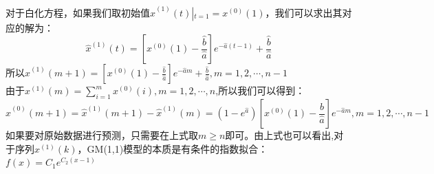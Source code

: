 \documentclass[openany]{progbookcn}
\begin{document}
\indent 对于白化方程，如果我们取初始值${\hat x^{(1)}}(t)\left| {_{t = 1} = {x^{(0)}}(1)} \right.$，我们可以求出其对应的解为：
\begin{equation}
{\hat x^{(1)}}(t) = \left[ {{x^{(0)}}(1) - \frac{{\hat b}}{{\hat a}}} \right]{e^{ - \hat a(t - 1)}} + \frac{{\hat b}}{{\hat a}}
\end{equation}
\indent 所以${\hat x^{(1)}}(m + 1) = \left[ {{x^{(0)}}(1) - \frac{{\hat b}}{{\hat a}}} \right]{e^{ - \hat am}} + \frac{{\hat b}}{{\hat a}},m = 1,2, \cdots ,n - 1$\\
\indent 由于${x^{(1)}}(m) = \sum\limits_{i = 1}^m {{x^{(0)}}(i),m = 1,2, \cdots ,n} $,所以我们可以得到：
\begin{equation}
{\hat x^{(0)}}(m + 1) = {\hat x^{(1)}}(m + 1) - {\hat x^{(1)}}(m) = (1 - {e^{\hat a}})\left[ {{x^{(0)}}(1) - \frac{{\hat b}}{{\hat a}}} \right]{e^{ - \hat am}},m = 1,2, \cdots ,n - 1
\end{equation}
\indent 如果要对原始数据进行预测，只需要在上式取$m\ge n$即可。由上式也可以看出,对于序列$x^{(1)}(k)$，GM(1,1)模型的本质是有条件的指数拟合：$f(x)=C_1e^{C_2(x-1)}$
\end{document}
